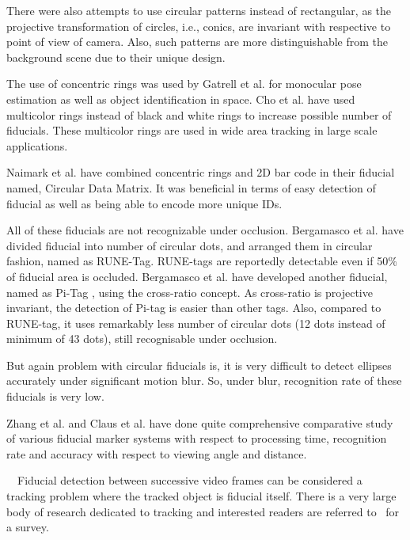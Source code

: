 \documentclass[runningheads]{llncs}
\begin{document}
There were also attempts to use circular patterns instead of rectangular, as
the projective transformation of circles, i.e., conics, are invariant with
respective to point of view of camera\cite{runetag11}. Also, such patterns are
more distinguishable from the background scene due to their unique design. 

The use of concentric rings was used  by Gatrell et al.\cite{concentric}
for monocular pose estimation as well as object identification in space. Cho et al.
\cite{Cho:2001,Cho97fastcolor} have used multicolor rings instead of
black and white rings\cite{concentric} to increase possible number of fiducials.
These multicolor rings are used in wide area tracking in large scale
applications. 

Naimark et al. \cite{NaimarkF02} have combined concentric rings and 2D bar code
in their fiducial named, Circular Data Matrix. It was beneficial in terms of
easy detection of fiducial as well as being able to encode more unique IDs.  

All of these fiducials are not recognizable under occlusion.
Bergamasco et al. \cite{runetag11} have divided fiducial into number of
circular dots, and arranged them in circular fashion, named as RUNE-Tag.
RUNE-tags are reportedly detectable even if 50\% of fiducial area is occluded.
Bergamasco et al. have developed another fiducial, named as Pi-Tag
\cite{Pitag13}, using the cross-ratio concept. As cross-ratio is projective
invariant, the detection of Pi-tag is easier than other tags. Also, compared
to RUNE-tag, it uses remarkably less number of circular dots (12 dots instead of
minimum of 43 dots), still recognisable under occlusion.

But again problem with circular fiducials is, it is very difficult to detect
ellipses accurately under significant motion blur. So, under blur, recognition
rate of these fiducials is very low.

Zhang et al.\cite{Zhang:2002} and Claus et al. \cite{ClausF04} have done
quite comprehensive comparative study of various fiducial marker systems with
respect to processing time, recognition rate and accuracy with
respect to viewing angle and distance.

~~Fiducial detection between successive video 
frames can be considered a tracking problem where the tracked object is fiducial itself.
There is a very large body of research dedicated to tracking and interested
readers are referred to~\cite{Yilmaz:2006} for a survey.
\end{document}
